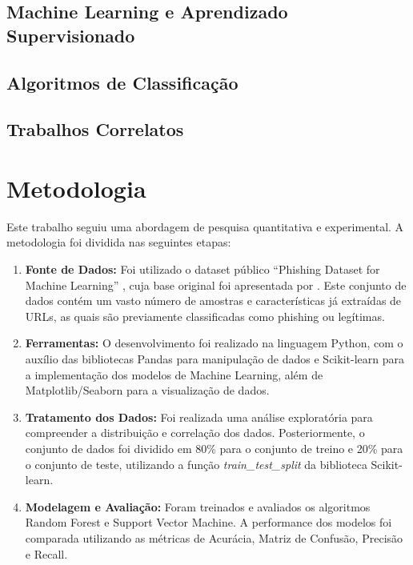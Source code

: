 \documentclass[12pt]{article}
\begin{document}
\subsection{Machine Learning e Aprendizado Supervisionado}

\subsection{Algoritmos de Classificação}

\subsection{Trabalhos Correlatos}


\section{Metodologia}
\label{sec:metodologia}
Este trabalho seguiu uma abordagem de pesquisa quantitativa e experimental. A metodologia foi dividida nas seguintes etapas:

\begin{enumerate}
    \item \textbf{Fonte de Dados:} Foi utilizado o dataset público ``Phishing Dataset for Machine Learning'' \parencite{kaggle_dataset_2022}, cuja base original foi apresentada por \textcite{mandadi2022}. Este conjunto de dados contém um vasto número de amostras e características já extraídas de URLs, as quais são previamente classificadas como phishing ou legítimas.

    \item \textbf{Ferramentas:} O desenvolvimento foi realizado na linguagem Python, com o auxílio das bibliotecas Pandas para manipulação de dados e Scikit-learn \parencite{scikit-learn} para a implementação dos modelos de Machine Learning, além de Matplotlib/Seaborn para a visualização de dados.

    \item \textbf{Tratamento dos Dados:} Foi realizada uma análise exploratória para compreender a distribuição e correlação dos dados. Posteriormente, o conjunto de dados foi dividido em 80\% para o conjunto de treino e 20\% para o conjunto de teste, utilizando a função \textit{train\_test\_split} da biblioteca Scikit-learn.

    \item \textbf{Modelagem e Avaliação:} Foram treinados e avaliados os algoritmos Random Forest e Support Vector Machine. A performance dos modelos foi comparada utilizando as métricas de Acurácia, Matriz de Confusão, Precisão e Recall.
\end{enumerate}
\end{document}
